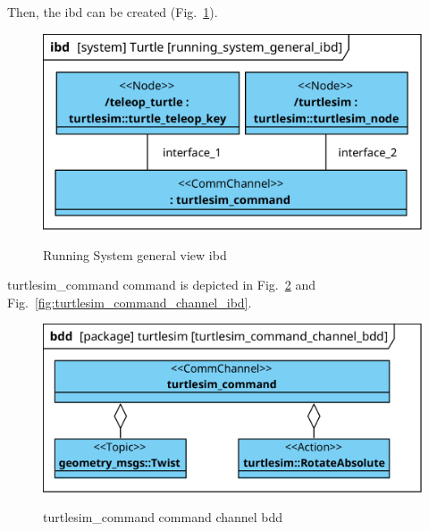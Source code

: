 \documentclass[11pt,oneside,a4paper]{report}
\begin{document}
Then, the ibd can be created (Fig.~\ref{fig:running_system_general_ibd}). 

\begin{figure}[H]
	\centering
	\begin{center}
		{\includegraphics[scale=1.0]{diagrams/running_system_general_ibd.png}}
	\end{center}
	\caption{Running System general view ibd}
	\label{fig:running_system_general_ibd}
\end{figure}

\textsf{turtlesim\_command command} \stCommChannel{} is depicted in Fig.~\ref{fig:turtlesim_command_channel_bdd} and Fig.~\ref{fig:turtlesim_command_channel_ibd}.


\begin{figure}[H]
	\centering
	\begin{center}
		{\includegraphics[scale=1.0]{diagrams/turtlesim_command_channel_bdd.png}}
	\end{center}
	\caption{turtlesim\_command command channel bdd}
	\label{fig:turtlesim_command_channel_bdd}
\end{figure}
\end{document}
